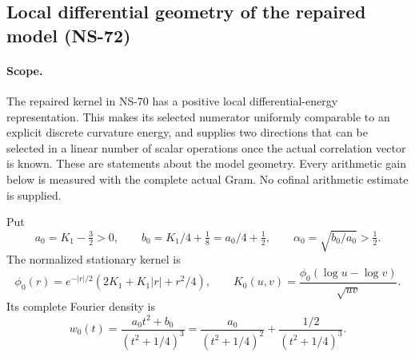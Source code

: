 \documentclass[11pt]{article}
\theoremstyle{remark}
\begin{document}
\subsection{Local differential geometry of the repaired model (NS-72)}
\label{sec:ns72-local-geometry}

\paragraph{Scope.}
The repaired kernel in NS-70 has a positive local differential-energy
representation. This makes its selected numerator uniformly comparable
to an explicit discrete curvature energy, and supplies two directions
that can be selected in a linear number of scalar operations once the
actual correlation vector is known. These are statements about the
model geometry. Every arithmetic gain below is measured with the
complete actual Gram. No cofinal arithmetic estimate is supplied.

Put
\[
 a_0=K_1-\tfrac32>0,\qquad b_0=K_1/4+\tfrac18=a_0/4+\tfrac12,
 \qquad \alpha_0=\sqrt{b_0/a_0}>\tfrac12.
\]
The normalized stationary kernel is
\[
 \phi_0(r)=e^{-|r|/2}(2K_1+K_1|r|+r^2/4),\qquad
 K_0(u,v)=\frac{\phi_0(\log u-\log v)}{\sqrt{uv}}.
\]
Its complete Fourier density is
\begin{equation}
 w_0(t)=\frac{a_0t^2+b_0}{(t^2+1/4)^3}
       =\frac{a_0}{(t^2+1/4)^2}
                       +\frac{1/2}{(t^2+1/4)^3}.
 \label{eq:ns72-positive-split}
\end{equation}
\end{document}
